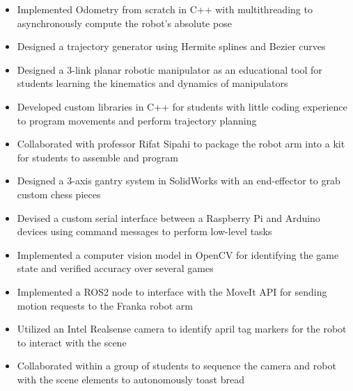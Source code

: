 \documentclass[10pt,a4paper,ragged2e,withhyper]{altacv}
\begin{document}
    \begin{itemize}
        \item Implemented Odometry from scratch in C++ with multithreading to asynchronously compute the robot's absolute pose
        \item Designed a trajectory generator using Hermite splines and Bezier curves
    \end{itemize}
    \begin{itemize}
        \item Designed a 3-link planar robotic manipulator as an educational tool for students learning the kinematics and dynamics of manipulators
        \item Developed custom libraries in C++ for students with little coding experience to program movements and perform trajectory planning
        \item Collaborated with professor Rifat Sipahi to package the robot arm into a kit for students to assemble and program
    \end{itemize}
    \begin{itemize}
        \item Designed a 3-axis gantry system in SolidWorks with an end-effector to grab custom chess pieces
        \item Devised a custom serial interface between a Raspberry Pi and Arduino devices using command messages to perform low-level tasks
        \item Implemented a computer vision model in OpenCV for identifying the game state and verified accuracy over several games
    \end{itemize}
    \begin{itemize}
        \item Implemented a ROS2 node to interface with the MoveIt API for sending motion requests to the Franka robot arm
        \item Utilized an Intel Realsense camera to identify april tag markers for the robot to interact with the scene
        \item Collaborated within a group of students to sequence the camera and robot with the scene elements to autonomously toast bread
    \end{itemize}
\end{document}
